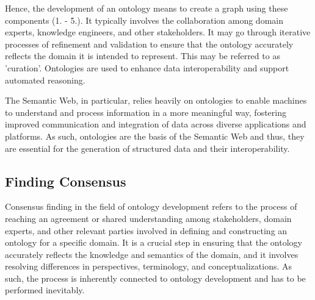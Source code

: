 Hence, the development of an ontology means to create a graph using these components (1. - 5.). It typically involves the collaboration among domain experts, knowledge engineers, and other stakeholders. It may go through iterative processes of refinement and validation to ensure that the ontology accurately reflects the domain it is intended to represent. This may be referred to as 'curation'. Ontologies are used to enhance data interoperability and support automated reasoning.

The Semantic Web, in particular, relies heavily on ontologies to enable machines to understand and process information in a more meaningful way, fostering improved communication and integration of data across diverse applications and platforms. As such, ontologies are the basis of the Semantic Web and thus, they are essential for the generation of structured data and their interoperability.


\subsection{Finding Consensus}

Consensus finding in the field of ontology development refers to the process of reaching an agreement or shared understanding among stakeholders, domain experts, and other relevant parties involved in defining and constructing an ontology for a specific domain. It is a crucial step in ensuring that the ontology accurately reflects the knowledge and semantics of the domain, and it involves resolving differences in perspectives, terminology, and conceptualizations. As such, the process is inherently connected to ontology development and has to be performed inevitably.

